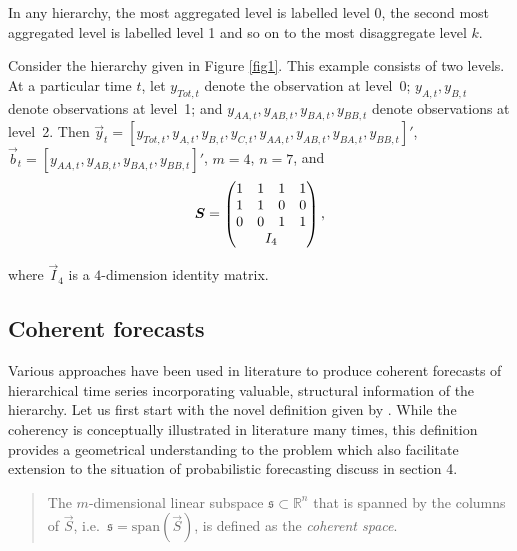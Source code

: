 \documentclass[graybox]{svmult}
\begin{document}
In any hierarchy, the most aggregated level is labelled level 0, the second most aggregated level is labelled level 1 and so on to the most disaggregate level $k$. 

Consider the hierarchy given in Figure \ref{fig1}. This example consists of two levels. At a particular time $t$, let $y_{Tot,t}$ denote the observation at level~0; $y_{A,t}, y_{B,t} $ denote observations at level~1; and $y_{AA,t}, y_{AB,t}, y_{BA,t}, y_{BB,t}$ denote observations at level~2. Then $\vec{y}_t = [y_{Tot,t},y_{A,t}, y_{B,t},y_{C,t},y_{AA,t}, y_{AB,t}, y_{BA,t}, y_{BB,t}]'$, $\vec{b}_t = [y_{AA,t}, y_{AB,t}, y_{BA,t}, y_{BB,t}]'$, $m=4$, $n=7$, and 
\begin{equation}
\vec{S} = \begin{pmatrix} 
1& 1& 1& 1  \\ 
1& 1& 0& 0 \\   
0& 0& 1& 1 \\ 
& \multicolumn{2}{c}{I_4} &   
\end{pmatrix}, 
\end{equation} 


where $\vec{I}_4$ is a $4$-dimension identity matrix.  

\subsection{Coherent forecasts}

Various approaches have been used in literature to produce coherent forecasts of hierarchical time series incorporating valuable, structural information of the hierarchy. Let us first start with the novel definition given by \cite{Gamakumara2018}. While the coherency is conceptually illustrated in literature many times, this definition provides a geometrical understanding to the problem which also facilitate extension to the situation of probabilistic forecasting discuss in section 4. 
\begin{quotation}
\begin{definition}\label{def:cohspace}
	\item[] The $m$-dimensional linear subspace $\mathfrak{s}\subset \mathbb{R}^n$ that is spanned by the columns of $\vec{S}$, i.e.\ $\mathfrak{s}=\text{span}(\vec{S})$, is defined as the \emph{coherent space}.
\end{definition}
\end{quotation}
\end{document}
